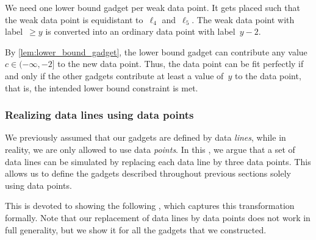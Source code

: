 \documentclass{toc}
\begin{document}
We need one lower bound gadget per weak data point.
It gets placed such that the weak data point is equidistant to~$\ell_4$ and~$\ell_5$.
The weak data point with label~$\geq y$ is converted into an ordinary data point with label~$y-2$.

By \cref{lem:lower_bound_gadget}, the lower bound gadget can contribute any value $c \in (-\infty,-2]$ to the new data point.
Thus, the data point can be fit perfectly if and only if the other gadgets contribute at least a value of~$y$ to the data point, that is, the intended lower bound constraint is met.

\subsubsection{Realizing data lines using data points}
\label{sec:data_lines_to_data_points}

We previously assumed that our gadgets are defined by data \emph{lines}, while in reality, we are only allowed to use data \emph{points}.
In this , we argue that a set of data lines can be simulated by replacing each data line by three data points.
This allows us to define the gadgets described throughout previous sections solely using data points.

This  is devoted to showing the following , which captures this transformation formally.
Note that our replacement of data lines by data points does not work in full generality, but we show it for all the gadgets that we constructed.

\end{document}
